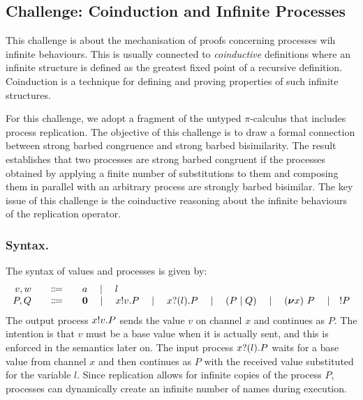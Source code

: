 \subsection{Challenge: Coinduction and Infinite Processes}
\label{sec:challenge:coinduction}

This challenge is  about the mechanisation of proofs concerning processes wih infinite behaviours.
This is usually connected to \emph{coinductive} definitions where an infinite
structure is defined as the greatest fixed point of a recursive
definition.
%
Coinduction is a technique for defining and proving properties of
such infinite structures.

For this challenge, we adopt a fragment of the untyped $\pi$-calculus
that includes process replication.
The objective of this challenge is to
draw a formal connection between strong barbed congruence and strong
barbed bisimilarity.
The result establishes that two processes are strong barbed congruent
if the processes obtained by applying a finite number of substitutions to
them and composing them in parallel with an arbitrary process are
strongly barbed bisimilar.
The key issue of this challenge is the coinductive reasoning about the infinite behaviours of the replication operator.

\subsubsection{Syntax.}
The syntax of values and processes is given by:
\begin{displaymath}
  \begin{array}{r@{\qquad}c@{\qquad}l}
    v,w & \Coloneqq & a \quad\mid\quad l \\
    P,Q & \Coloneqq & \Pend
               \quad \mid\quad \Pout{x}{v}{P}
               \quad \mid\quad \Pin{x}{l}{P}
               \quad \mid\quad \PBpar{P}{Q}
               \quad \mid\quad \Pres{x}{}{P}
               \quad \mid\quad !P
  \end{array}
\end{displaymath}
The output process \( x ! v . P \) sends the value \( v \) on channel \( x \) and continues as \( P \).
The intention is that \( v \) must be a base value when it is actually sent, and this is enforced in the semantics later on.
The input process \( x ? (l) . P \) waits for a base value from channel \( x \) and then continues as \( P \) with the received value substituted for the variable \( l \).
Since replication allows for infinite copies of the process $P$, processes can dynamically
create an infinite number of names during execution.


